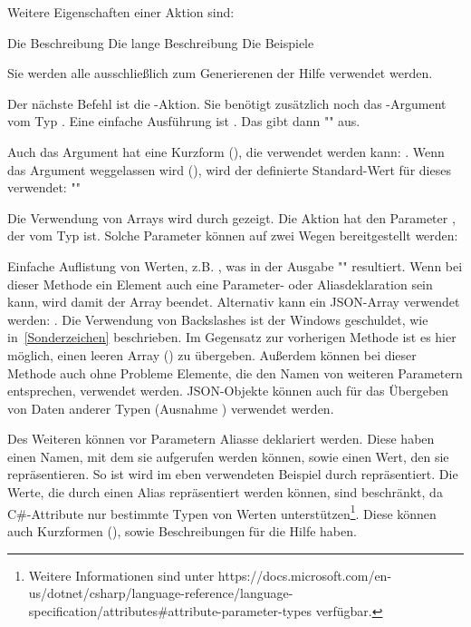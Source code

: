 Weitere Eigenschaften einer Aktion sind:
\begin{outline}
 \1 Die Beschreibung
 \1 Die lange Beschreibung
 \1 Die Beispiele
\end{outline}
Sie werden alle ausschlie\ss lich zum Generierenen der Hilfe verwendet werden.

Der nächste Befehl ist die -Aktion.
Sie benötigt zusätzlich noch das -Argument vom Typ .
Eine einfache Ausführung ist .
Das gibt dann "" aus.

Auch das Argument hat eine Kurzform (), die verwendet werden kann: .
Wenn das Argument weggelassen wird (), wird der definierte Standard-Wert für dieses verwendet:
""

Die Verwendung von Arrays wird durch  gezeigt.
Die Aktion hat den Parameter , der vom Typ  ist.
Solche Parameter können auf zwei Wegen bereitgestellt werden:
\begin{outline}
 \1 Einfache Auflistung von Werten, z.B. , was in der Ausgabe "" resultiert.
 Wenn bei dieser Methode ein Element auch eine Parameter- oder Aliasdeklaration sein kann, wird damit der Array beendet.
 \1 Alternativ kann ein JSON-Array verwendet werden: .
 Die Verwendung von Backslashes ist der Windows  geschuldet, wie in~\ref{Sonderzeichen} beschrieben.
 Im Gegensatz zur vorherigen Methode ist es hier möglich, einen leeren Array (\inlinecode{[]}) zu übergeben.
 Au\ss erdem können bei dieser Methode auch ohne Probleme Elemente, die den Namen von weiteren Parametern entsprechen, verwendet werden.
 JSON-Objekte können auch für das \"Ubergeben von Daten anderer Typen (Ausnahme ) verwendet werden.
\end{outline} 

Des Weiteren können vor Parametern Aliasse deklariert werden.
Diese haben einen Namen, mit dem sie aufgerufen werden können, sowie einen Wert, den sie repräsentieren.
So ist wird im eben verwendeten Beispiel  durch  repräsentiert.
Die Werte, die durch einen Alias repräsentiert werden können, sind beschränkt, da C\#-Attribute nur bestimmte Typen von Werten unterstützen\footnote{Weitere Informationen sind unter https://docs.microsoft.com/en-us/dotnet/csharp/language-reference/language-specification/attributes\#attribute-parameter-types verfügbar.}.
Diese können auch Kurzformen (), sowie Beschreibungen für die Hilfe haben.

